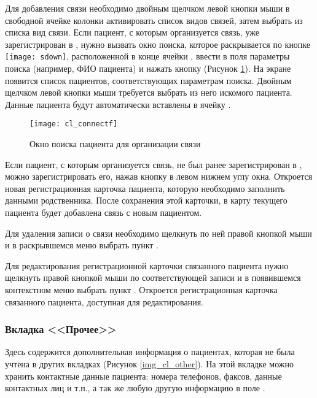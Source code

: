 Для добавления связи необходимо двойным щелчком левой кнопки мыши в свободной ячейке колонки  активировать список видов связей, затем выбрать из списка вид связи. Если пациент, с которым организуется связь, уже зарегистрирован в \tmis, нужно вызвать окно поиска, которое раскрывается по кнопке \texttt{[image: sdown]}, расположенной в конце ячейки , ввести в поля параметры поиска (например, ФИО пациента) и нажать кнопку  (Рисунок \ref{img_cl_connectf}). На экране появится список пациентов, соответствующих параметрам поиска. Двойным щелчком левой кнопки мыши требуется выбрать из него искомого пациента. Данные пациента будут автоматически вставлены в ячейку .

\begin{figure}[ht!]\centering
 \texttt{[image: cl\_connectf]}
 \caption{Окно поиска пациента для организации связи}
 \label{img_cl_connectf}
\end{figure} 

Если пациент, с которым организуется связь, не был ранее зарегистрирован в \tmis, можно зарегистрировать его, нажав кнопку  в левом нижнем углу окна. Откроется новая регистрационная карточка пациента, которую необходимо заполнить данными родственника. После сохранения этой карточки, в карту текущего пациента будет добавлена связь с новым пациентом.

Для удаления записи о связи необходимо щелкнуть по ней правой кнопкой мыши и в раскрывшемся меню выбрать пункт .

Для редактирования регистрационной карточки связанного пациента нужно щелкнуть правой кнопкой мыши по соответствующей записи и в появившемся контекстном меню выбрать пункт . Откроется регистрационная карточка связанного пациента, доступная для редактирования.

\subsubsection{Вкладка <<Прочее>>}

Здесь содержится дополнительная информация о пациентах, которая не была учтена в других вкладках (Рисунок \ref{img_cl_other}). На этой вкладке можно хранить контактные данные пациента: номера телефонов, факсов, данные контактных лиц и т.п., а так же любую другую информацию в поле .

